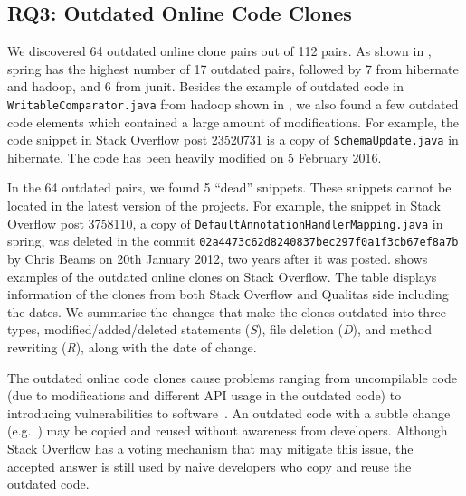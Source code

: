 \documentclass[sigconf,review, anonymous]{acmart}
\begin{document}
\subsection{RQ3: Outdated Online Code Clones}



We discovered 64 outdated online clone pairs out of 112 pairs. As
shown in , \textsf{spring} has the highest number
of 17 outdated pairs, followed by 7 from \textsf{hibernate} and
\textsf{hadoop}, and 6 from \textsf{junit}. Besides the example of
outdated code in %
{\small{\texttt{WritableComparator.java}}} 
from \textsf{hadoop} shown in
, we also found a few outdated code elements
which contained a large amount of modifications. For example, the code
snippet in Stack Overflow post 23520731 is a copy of
{\small{\texttt{SchemaUpdate.java}}} in \textsf{hibernate}. The code
has been heavily modified on 5 February 2016.

In the 64 outdated pairs, we found 5 ``dead'' snippets. These snippets
cannot be located in the latest version of the projects. For example,
the snippet in Stack Overflow post 3758110, a copy of
{\small{\texttt{DefaultAnnotationHandlerMapping.java}}} in
\textsf{spring}, was deleted in the commit
{\small{\texttt{02a4473c62d8240837bec297f0a1f3cb67ef8a7b}}} by Chris
Beams on 20th January 2012, two years after it was
posted. 
 shows examples of the outdated online
clones on Stack Overflow. The table displays information of the clones
from both Stack Overflow and Qualitas side including the dates. We
summarise the changes that make the clones outdated into three types,
modified/added/deleted statements (\textit{S}), file deletion
(\textit{D}), and method rewriting (\textit{R}), along with the date
of change.

The outdated online code clones cause problems ranging from
uncompilable code (due to modifications and different API usage in the
outdated code) to introducing vulnerabilities to
software~\cite{Xia2014}. An outdated code with a subtle change
(e.g.~) may be copied and reused without
awareness from developers. Although Stack Overflow has a voting
mechanism that may mitigate this issue, the accepted answer is still
used by naive developers who copy and reuse the outdated code.
\end{document}
